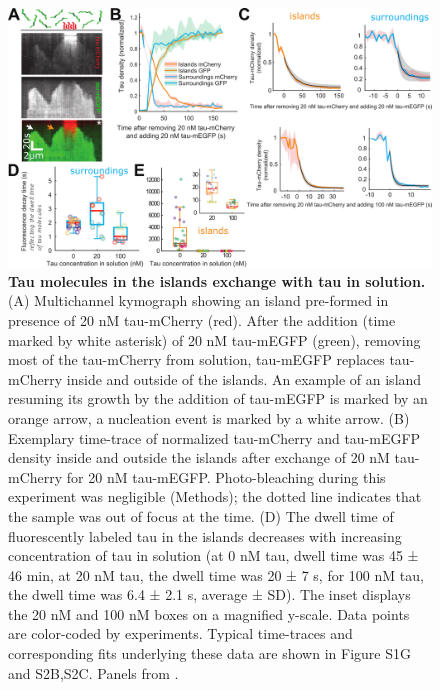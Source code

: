 \begin{figure}[h!]
	\centering
	\includegraphics[width=1\linewidth]{Figures/tau_EXCHANGE.png}
	\caption[Tau molecules in the islands exchange with tau in solution.]{
	\textbf{Tau molecules in the islands exchange with tau in solution.} (A) Multichannel kymograph showing an island pre-formed in presence of 20 nM tau-mCherry (red). After the addition (time marked by white asterisk) of 20 nM tau-mEGFP (green), removing most of the tau-mCherry from solution, tau-mEGFP replaces tau-mCherry inside and outside of the islands. An example of an island resuming its growth by the addition of tau-mEGFP is marked by an orange arrow, a nucleation event is marked by a white arrow. (B) Exemplary time-trace of normalized tau-mCherry and tau-mEGFP density inside and outside the islands after exchange of 20 nM tau-mCherry for 20 nM tau-mEGFP. Photo-bleaching during this experiment was negligible (Methods); the dotted line indicates that the sample was out of focus at the time. (D) The dwell time of fluorescently labeled tau in the islands decreases with increasing concentration of tau in solution (at 0 nM tau, dwell time was 45 ± 46 min, at 20 nM tau, the dwell time was 20 ± 7 s, for 100 nM tau, the dwell time was 6.4 ± 2.1 s, average ± SD). The inset displays the 20 nM and 100 nM boxes on a magnified y-scale. Data points are color-coded by experiments. Typical time-traces and corresponding fits underlying these data are shown in Figure S1G and S2B,S2C. Panels from \cite{Siahaan2019a}.
		}\label{tauexchange}
\end{figure}

